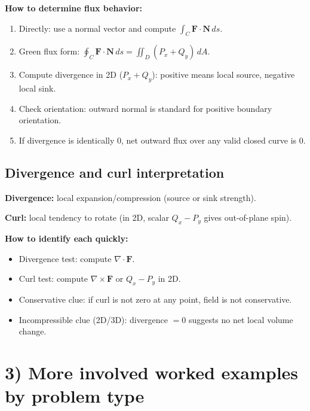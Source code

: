 \documentclass[12pt, twoside]{article}
\begin{document}
\textbf{How to determine flux behavior:}
\begin{enumerate}[leftmargin=*]
  \item Directly: use a normal vector and compute $\int_C\mathbf{F}\cdot\mathbf{N}\,ds$.
  \item Green flux form: $\oint_C\mathbf{F}\cdot\mathbf{N}\,ds=\iint_D(P_x+Q_y)\,dA$.
  \item Compute divergence in 2D ($P_x+Q_y$): positive means local source, negative local sink.
  \item Check orientation: outward normal is standard for positive boundary orientation.
  \item If divergence is identically $0$, net outward flux over any valid closed curve is $0$.
\end{enumerate}

\subsection*{Divergence and curl interpretation}
\textbf{Divergence:} local expansion/compression (source or sink strength).

\textbf{Curl:} local tendency to rotate (in 2D, scalar $Q_x-P_y$ gives out-of-plane spin).

\textbf{How to identify each quickly:}
\begin{itemize}[leftmargin=*]
  \item Divergence test: compute $\nabla\cdot\mathbf{F}$.
  \item Curl test: compute $\nabla\times\mathbf{F}$ or $Q_x-P_y$ in 2D.
  \item Conservative clue: if curl is not zero at any point, field is not conservative.
  \item Incompressible clue (2D/3D): divergence $=0$ suggests no net local volume change.
\end{itemize}

\section*{3) More involved worked examples by problem type}
\end{document}
